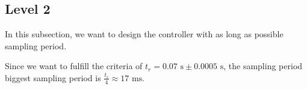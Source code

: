 \subsection*{Level 2}

In this subsection, we want to design the controller with as long as possible sampling period. 

Since we want to fulfill the criteria of $t_r = 0.07 \text{ s} \pm 0.0005 \text{ s}$, the sampling period biggest sampling period is $\frac{t_r}{4} \approx 17 \text{ ms}$.  
